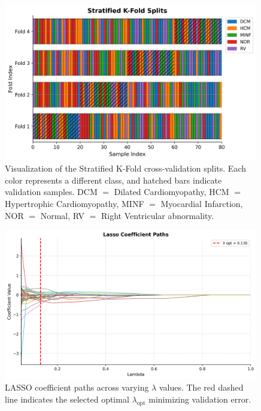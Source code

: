 \begin{figure}
	\begin{center}
		\includegraphics[width=0.99\textwidth]{../images/splits/kfold.png}
	\end{center}
	\caption{Visualization of the Stratified K-Fold cross-validation splits. Each
		color represents a different class, and hatched bars indicate validation
		samples. DCM $=$ Dilated Cardiomyopathy, HCM $=$ Hypertrophic
		Cardiomyopathy, MINF $=$ Myocardial Infarction, NOR $=$ Normal, RV $=$
		Right Ventricular abnormality.}
	\label{fig:figA7}
\end{figure}

\begin{figure}
	\begin{center}
		\includegraphics[width=0.99\textwidth]{../images/lasso/coeff_vs_lambda.png}
	\end{center}
	\caption{LASSO coefficient paths across varying \(\lambda\) values. The red
		dashed line indicates the selected optimal \(\lambda_{\text{opt}}\)
		minimizing validation error.}
	\label{fig:figA8}
\end{figure}

